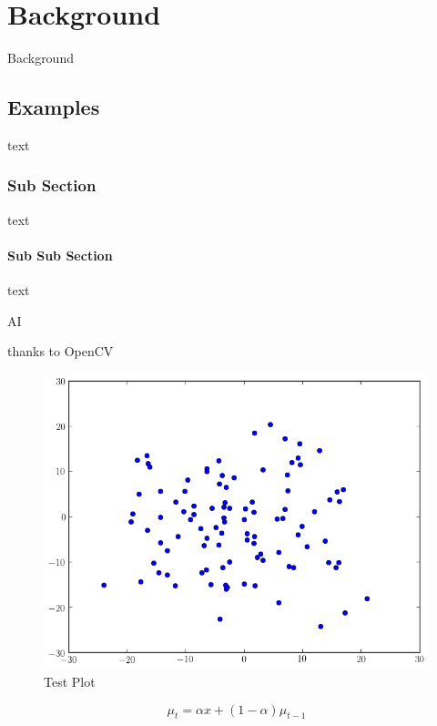 \glsresetall %
\chapter{Background}\label{ch:Background}
Background

\section{Examples}
text
\subsection{Sub Section}
text
\subsubsection{Sub Sub Section}
text

\noindent \gls{AI}

\noindent thanks to OpenCV\cite{opencv}

\begin{figure}[!htbp]
	\centering
	\includegraphics[width = 5in]{figs/testPlot.png}
	\caption{Test Plot}
	\label{fig.testPlot}
\end{figure}

\begin{equation}
	\mu_t = \alpha x + (1 - \alpha) \mu_{t-1}
	\label{eqn.lowpassfilter}
\end{equation}

